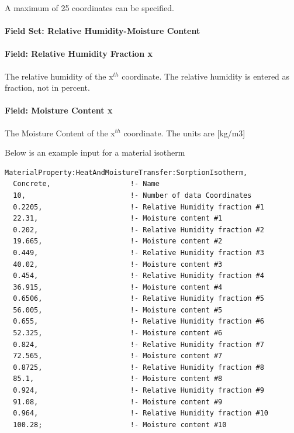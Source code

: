 A maximum of 25 coordinates can be specified.

\paragraph{Field Set: Relative Humidity-Moisture Content}\label{field-set-relative-humidity-moisture-content}

\paragraph{Field: Relative Humidity Fraction x}\label{field-relative-humidity-fraction-x}

The relative humidity of the x\(^{th}\) coordinate. The relative humidity is entered as fraction, not in percent.

\paragraph{Field: Moisture Content x}\label{field-moisture-content-x}

The Moisture Content of the x\(^{th}\) coordinate. The units are {[}kg/m3{]}

Below is an example input for a material isotherm

\begin{lstlisting}
MaterialProperty:HeatAndMoistureTransfer:SorptionIsotherm,
  Concrete,                   !- Name
  10,                         !- Number of data Coordinates
  0.2205,                     !- Relative Humidity fraction #1
  22.31,                      !- Moisture content #1
  0.202,                      !- Relative Humidity fraction #2
  19.665,                     !- Moisture content #2
  0.449,                      !- Relative Humidity fraction #3
  40.02,                      !- Moisture content #3
  0.454,                      !- Relative Humidity fraction #4
  36.915,                     !- Moisture content #4
  0.6506,                     !- Relative Humidity fraction #5
  56.005,                     !- Moisture content #5
  0.655,                      !- Relative Humidity fraction #6
  52.325,                     !- Moisture content #6
  0.824,                      !- Relative Humidity fraction #7
  72.565,                     !- Moisture content #7
  0.8725,                     !- Relative Humidity fraction #8
  85.1,                       !- Moisture content #8
  0.924,                      !- Relative Humidity fraction #9
  91.08,                      !- Moisture content #9
  0.964,                      !- Relative Humidity fraction #10
  100.28;                     !- Moisture content #10
\end{lstlisting}

